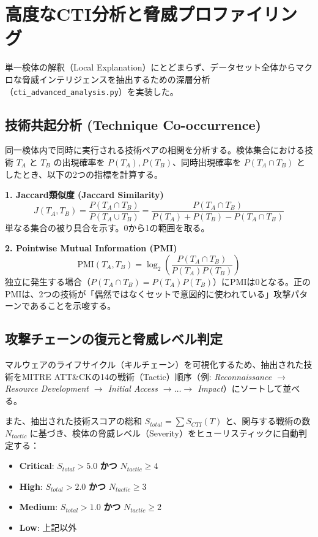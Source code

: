 \documentclass[11pt,a4paper,dvipdfmx]{article}
\begin{document}
\section{高度なCTI分析と脅威プロファイリング}

単一検体の解釈（Local Explanation）にとどまらず、データセット全体からマクロな脅威インテリジェンスを抽出するための深層分析（\texttt{cti\_advanced\_analysis.py}）を実装した。

\subsection{技術共起分析 (Technique Co-occurrence)}
同一検体内で同時に実行される技術ペアの相関を分析する。検体集合における技術 $T_A$ と $T_B$ の出現確率を $P(T_A), P(T_B)$、同時出現確率を $P(T_A \cap T_B)$ としたとき、以下の2つの指標を計算する。

\textbf{1. Jaccard類似度 (Jaccard Similarity)}
\begin{equation}
    J(T_A, T_B) = \frac{P(T_A \cap T_B)}{P(T_A \cup T_B)} = \frac{P(T_A \cap T_B)}{P(T_A) + P(T_B) - P(T_A \cap T_B)}
\end{equation}
単なる集合の被り具合を示す。0から1の範囲を取る。

\textbf{2. Pointwise Mutual Information (PMI)}
\begin{equation}
    \text{PMI}(T_A, T_B) = \log_2 \left( \frac{P(T_A \cap T_B)}{P(T_A)P(T_B)} \right)
\end{equation}
独立に発生する場合（$P(T_A \cap T_B) = P(T_A)P(T_B)$）にPMIは0となる。正のPMIは、2つの技術が「偶然ではなくセットで意図的に使われている」攻撃パターンであることを示唆する。

\subsection{攻撃チェーンの復元と脅威レベル判定}
マルウェアのライフサイクル（キルチェーン）を可視化するため、抽出された技術をMITRE ATT\&CKの14の戦術（Tactic）順序（例: \textit{Reconnaissance $\rightarrow$ Resource Development $\rightarrow$ Initial Access $\rightarrow \dots \rightarrow$ Impact}）にソートして並べる。

また、抽出された技術スコアの総和 $S_{total} = \sum S_{CTI}(T)$ と、関与する戦術の数 $N_{tactic}$ に基づき、検体の脅威レベル（Severity）をヒューリスティックに自動判定する：
\begin{itemize}
    \item \textbf{Critical}: $S_{total} > 5.0$ \textbf{かつ} $N_{tactic} \ge 4$
    \item \textbf{High}: $S_{total} > 2.0$ \textbf{かつ} $N_{tactic} \ge 3$
    \item \textbf{Medium}: $S_{total} > 1.0$ \textbf{かつ} $N_{tactic} \ge 2$
    \item \textbf{Low}: 上記以外
\end{itemize}
\end{document}
